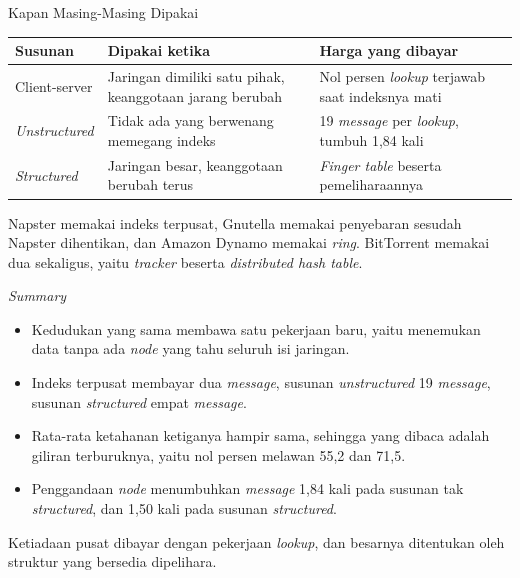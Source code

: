 \documentclass[aspectratio=169, table, 12pt]{beamer}
\begin{document}
\begin{frame}{{\Large Kapan Masing-Masing Dipakai}}
  \vspace{8pt}
  \centering
  \small
  \begin{tabularx}{0.96\textwidth}{|l|X|X|}
    \hline
    \textbf{Susunan} & \textbf{Dipakai ketika} & \textbf{Harga yang dibayar} \\
    \hline
    Client-server & Jaringan dimiliki satu pihak, keanggotaan jarang berubah & Nol persen \textit{lookup} terjawab saat indeksnya mati \\
    \hline
    \textit{Unstructured} & Tidak ada yang berwenang memegang indeks & 19 \textit{message} per \textit{lookup}, tumbuh 1,84 kali \\
    \hline
    \textit{Structured} & Jaringan besar, keanggotaan berubah terus & \textit{Finger table} beserta pemeliharaannya \\
    \hline
  \end{tabularx}

  \vspace{8pt}
  \raggedright
  {\small Napster memakai indeks terpusat, Gnutella memakai penyebaran sesudah
  Napster dihentikan, dan Amazon Dynamo memakai \textit{ring}. BitTorrent
  memakai dua sekaligus, yaitu \textit{tracker} beserta \textit{distributed hash
  table}.}
\end{frame}

\begin{frame}{{\Large \textit{Summary}}}
  \vspace{10pt}
  \begin{itemize}\small
    \item Kedudukan yang sama membawa satu pekerjaan baru, yaitu menemukan data
          tanpa ada \textit{node} yang tahu seluruh isi jaringan.
    \item Indeks terpusat membayar dua \textit{message}, susunan \textit{unstructured} 19 \textit{message},
          susunan \textit{structured} empat \textit{message}.
    \item Rata-rata ketahanan ketiganya hampir sama, sehingga yang dibaca
          adalah giliran terburuknya, yaitu nol persen melawan 55,2 dan 71,5.
    \item Penggandaan \textit{node} menumbuhkan \textit{message} 1,84 kali pada susunan tak
          \textit{structured}, dan 1,50 kali pada susunan \textit{structured}.
  \end{itemize}

  \vspace{10pt}
  {\small Ketiadaan pusat dibayar dengan pekerjaan \textit{lookup},
  dan besarnya ditentukan oleh struktur yang bersedia dipelihara.}
\end{frame}
\end{document}

